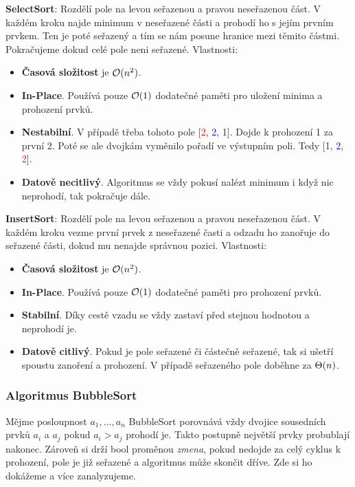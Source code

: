\noindent \textbf{SelectSort}: Rozdělí pole na levou seřazenou a pravou neseřazenou část. V každém kroku najde minimum v neseřazené části a prohodí ho s jejím prvním prvkem. Ten je poté seřazený a tím se nám posune hranice mezi těmito částmi. Pokračujeme dokud celé pole neni seřazené. Vlastnosti:
\begin{itemize}
    \item \textbf{Časová složitost} je $\mathcal{O}(n^2)$.
    \item \textbf{In-Place}. Používá pouze $\mathcal{O}(1)$ dodatečné paměti pro uložení minima a prohození prvků.
    \item \textbf{Nestabilní}. V případě třeba tohoto pole [\textcolor{red}{2}, \textcolor{blue}{2}, 1]. Dojde k prohození 1 za první 2. Poté se ale dvojkám vyměnilo pořadí ve výstupním poli. Tedy [1, \textcolor{blue}{2}, \textcolor{red}{2}].
    \item \textbf{Datově necitlivý}. Algoritmus se vždy pokusí nalézt minimum i když nic neprohodí, tak pokračuje dále.
\end{itemize} \medskip

\noindent \textbf{InsertSort}: Rozdělí pole na levou seřazenou a pravou neseřazenou část. V každém kroku vezme první prvek z neseřazené časti a odzadu ho zanořuje do seřazené části, dokud mu nenajde správnou pozici. Vlastnosti:
\begin{itemize}
    \item \textbf{Časová složitost} je $\mathcal{O}(n^2)$.
    \item \textbf{In-Place}. Používá pouze $\mathcal{O}(1)$ dodatečné paměti pro prohození prvků.
    \item \textbf{Stabilní}. Díky cestě vzadu se vždy zastaví před stejnou hodnotou a neprohodí je.
    \item \textbf{Datově citlivý}. Pokud je pole seřazené či částečně seřazené, tak si ušetří spoustu zanoření a prohození. V případě seřazeného pole doběhne za $\Theta(n)$.
\end{itemize} \bigskip

\subsubsection{Algoritmus BubbleSort}

Mějme posloupnost $a_1, \dots, a_n$ BubbleSort porovnává vždy dvojice sousedních prvků $a_i$ a $a_j$ pokud $a_i > a_j$ prohodí je. Takto postupně největší prvky probublají nakonec. Zároveň si drží bool proměnou \textit{zmena}, pokud nedojde za celý cyklus k prohození, pole je již seřazené a algoritmus může skončit dříve. Zde si ho dokážeme a více zanalyzujeme.


